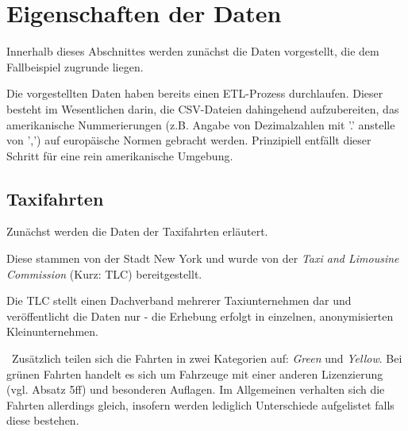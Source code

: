 \section{Eigenschaften der Daten}
\label{sec:Daten}
Innerhalb dieses Abschnittes werden zunächst die Daten vorgestellt, die dem Fallbeispiel zugrunde liegen. 

Die vorgestellten Daten haben bereits einen ETL-Prozess durchlaufen. Dieser besteht im Wesentlichen darin, die CSV-Dateien dahingehend aufzubereiten, das amerikanische Nummerierungen (z.B. Angabe von Dezimalzahlen mit '.' anstelle von ',') auf europäische Normen gebracht werden. Prinzipiell entfällt dieser Schritt für eine rein amerikanische Umgebung. 
\subsection{Taxifahrten}
\label{subsec:Taxidaten}
Zunächst werden die Daten der Taxifahrten erläutert. 

Diese stammen von der Stadt New York \cite{SourceTaxi} und wurde von der \textit{Taxi and Limousine Commission} (Kurz: TLC) bereitgestellt. 

Die TLC stellt einen Dachverband mehrerer Taxiunternehmen dar und veröffentlicht die Daten nur - die Erhebung erfolgt in einzelnen, anonymisierten Kleinunternehmen. 

~\newline Zusätzlich teilen sich die Fahrten in zwei Kategorien auf: \textit{Green} und \textit{Yellow}. Bei grünen Fahrten handelt es sich um Fahrzeuge mit einer anderen Lizenzierung (vgl. \cite{GreenTaxis} Absatz 5ff) und besonderen Auflagen. Im Allgemeinen verhalten sich die Fahrten allerdings gleich, insofern werden lediglich Unterschiede aufgelistet falls diese bestehen.
